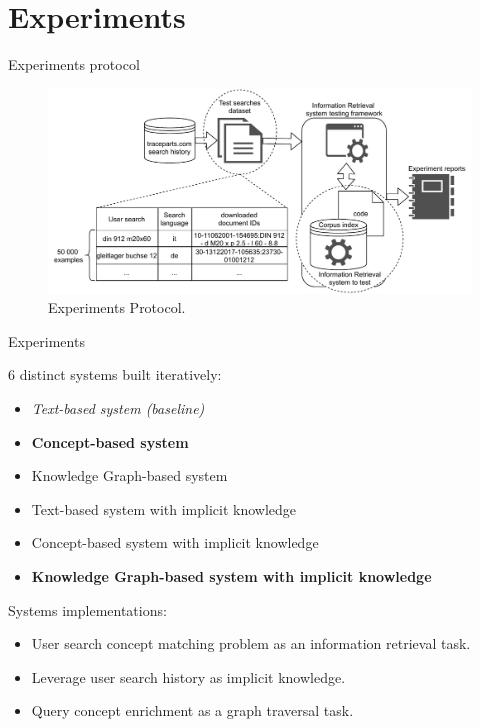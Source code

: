 \section{Experiments}

\begin{frame}{Experiments protocol}

    \begin{figure} [H]
        \begin{center}
            \includegraphics[scale=0.5]{images/tp-search-expe-setting.pdf} 
            \caption{Experiments Protocol.} 
        \end{center}
    \end{figure}

\end{frame}

\begin{frame}{Experiments}

    6 distinct systems built iteratively:
    \begin{itemize}
        \item \emph{Text-based system (baseline)}
        \item \textbf{Concept-based system}
        \item Knowledge Graph-based system
        \item Text-based system with implicit knowledge
        \item Concept-based system with implicit knowledge
        \item \textbf{Knowledge Graph-based system with implicit knowledge}
    \end{itemize}
    
    Systems implementations:
    \begin{itemize}
        \item User search concept matching problem as an information retrieval task.
        \item Leverage user search history as implicit knowledge.
        \item Query concept enrichment as a graph traversal task.
    \end{itemize}

\end{frame}

